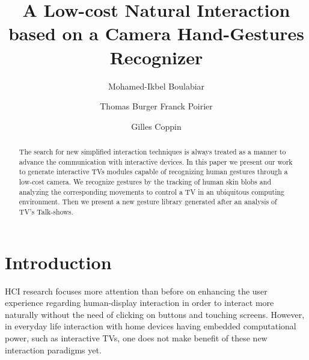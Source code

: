 \documentclass{llncs}
\newcommand\ignore[1]{}
\begin{document}
\frontmatter          %
\pagestyle{headings}  %
\mainmatter              %
%
\title{A Low-cost Natural Interaction based on a Camera Hand-Gestures Recognizer}
\author{Mohamed-Ikbel Boulabiar \and Thomas Burger
Franck Poirier \and Gilles Coppin}
%

\maketitle

\begin{abstract}
The search for new simplified interaction techniques is always treated as a
manner to advance the communication with interactive devices.
In this paper we present our work to generate interactive TVs modules capable of
recognizing human gestures through a low-cost camera.
We recognize gestures by the tracking of human skin blobs and analyzing the 
corresponding movements to control a TV in an ubiquitous computing environment.
Then we present a new gesture library generated after an analysis of TV's Talk-shows.

\ignore{
The abstract should summarize the contents of the paper
using at least 70 and at most 150 words. It will be set in 9-point
font size and be inset 1.0 cm from the right and left margins.
There will be two blank lines before and after the Abstract. \dots
}
\end{abstract}
%

\section{Introduction}
HCI research focuses more attention than before on enhancing the user experience regarding human-display interaction in order to interact more naturally without the need of clicking on buttons and touching screens. However, in everyday life interaction with home devices having embedded computational power, such as interactive TVs, one does not make benefit of these new interaction paradigms yet. 
\end{document}
